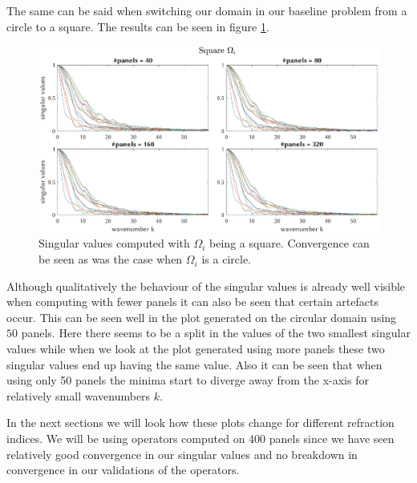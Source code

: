 \documentclass[a4paper, oneside]{thirdparty_stylesheets/discothesis}
\begin{document}
The same can be said when switching our domain in our baseline problem from a circle to a square.
The results can be seen in figure \ref{fig:SVs_square}.
\begin{figure} [!ht]
	\centering
	\includegraphics[width=\columnwidth]{figures/SVs_square.eps}
	\caption{ 
		Singular values computed with $\Omega_i$ being a square. 
		Convergence can be seen as was the case when $\Omega_i$ is a circle.
	}
	\label{fig:SVs_square}
\end{figure}
Although qualitatively the behaviour of the singular values is already well visible when computing with fewer panels it can also be seen that certain artefacts occur.
This can be seen well in the plot generated on the circular domain using $50$ panels.
Here there seems to be a split in the values of the two smallest singular values while when we look at the plot generated using more panels these two singular values end up having the same value.
Also it can be seen that when using only 50 panels the minima start to diverge away from the x-axis for relatively small wavenumbers $k$.

In the next sections we will look how these plots change for different refraction indices.
We will be using operators computed on 400 panels since we have seen relatively good convergence in our singular values and no breakdown in convergence in our validations of the operators.
\end{document}
